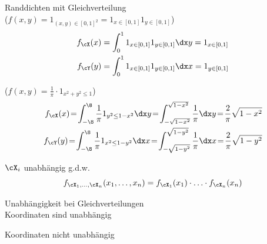 \shortexample Randdichten mit Gleichverteilung\\
 {\scriptsize ($f(x, y) = 1_{(x, y) \in [0, 1]^2} = 1_{x \in [0, 1]} 1_{y \in [0, 1]}$)}
\begin{align*}
    f_\cX(x) & = \int_{0}^{1} 1_{x \in [0, 1]} 1_{y \in [0, 1]} \dx y = 1_{x \in [0, 1]} \\
    f_\cY(y) & = \int_{0}^{1} 1_{x \in [0, 1]} 1_{y \in [0, 1]} \dx x = 1_{y \in [0, 1]}
\end{align*}

 {\scriptsize ($f(x, y) = \frac{1}{\pi} \cdot 1_{x^2 + y^2 \leq 1}$)}
\begin{align*}
    f_\cX(x) \! = \! \int_{-\8}^{\8} \frac{1}{\pi} 1_{y^2 \leq 1 - x^2} \dx y \! = \! \int_{-\sqrt{1 - x^2}}^{\sqrt{1 - x^2}} \frac{1}{\pi} \dx y \!
    = \! \frac{2}{\pi} \sqrt{1 - x^2} \\
    f_\cY(y) \! = \! \int_{-\8}^{\8} \frac{1}{\pi} 1_{x^2 \leq 1 - y^2} \dx x \! = \! \int_{-\sqrt{1 - y^2}}^{\sqrt{1 - y^2}} \frac{1}{\pi} \dx x \! = \! \frac{2}{\pi} \sqrt{1 - y^2}
\end{align*}

\shorttheorem[Unabhängigkeit] $\cX_i$ unabhängig g.d.w.
\[
    f_{\cX_1, \ldots, \cX_n}(x_1, \ldots, x_n) = f_{\cX_1}(x_1) \cdot \ldots \cdot f_{\cX_n}(x_n)
\]

\shortexample Unabhängigkeit bei Gleichverteilungen\\
 Koordinaten sind unabhängig

 Koordinaten nicht unabhängig
